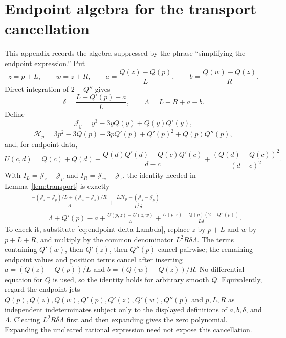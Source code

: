 \section{Endpoint algebra for the transport cancellation}\label{app:endpoints}

This appendix records the algebra suppressed by the phrase ``simplifying the
endpoint expression.'' Put
\[
 z=p+L,\qquad w=z+R,\qquad
 a=\frac{Q(z)-Q(p)}L,\qquad b=\frac{Q(w)-Q(z)}R.
\]
Direct integration of \(2-Q''\) gives
\begin{equation}\label{eq:endpoint-delta-Lambda}
 \delta=\frac{L+Q'(p)-a}{L},\qquad
 \Lambda=L+R+a-b.
\end{equation}
Define
\[
 \mathcal J_y=y^3-3yQ(y)+Q(y)Q'(y),
\]
\[
 \mathcal H_p=3p^2-3Q(p)-3pQ'(p)+Q'(p)^2+Q(p)Q''(p),
\]
and, for endpoint data,
\[
 U(c,d)=Q(c)+Q(d)-\frac{Q(d)Q'(d)-Q(c)Q'(c)}{d-c}
 +\frac{(Q(d)-Q(c))^2}{(d-c)^2}.
\]
With \(I_L=\mathcal J_z-\mathcal J_p\) and
\(I_R=\mathcal J_w-\mathcal J_z\), the identity needed in
Lemma~\ref{lem:transport} is exactly
\begin{align*}
&\frac{-(\mathcal J_z-\mathcal J_p)/L
 +(\mathcal J_w-\mathcal J_z)/R}{\Lambda}
 +\frac{L\mathcal H_p-(\mathcal J_z-\mathcal J_p)}{L^2\delta}\\
&\quad=\Lambda+Q'(p)-a
 +\frac{U(p,z)-U(z,w)}{\Lambda}
 +\frac{U(p,z)-Q(p)(2-Q''(p))}{L\delta}.
\end{align*}
To check it, substitute \eqref{eq:endpoint-delta-Lambda}, replace
\(z\) by \(p+L\) and \(w\) by \(p+L+R\), and multiply by the common
denominator \(L^2R\delta\Lambda\). The terms containing \(Q'(w)\), then
\(Q'(z)\), then \(Q''(p)\) cancel pairwise; the remaining endpoint values and
position terms cancel after inserting \(a=(Q(z)-Q(p))/L\) and
\(b=(Q(w)-Q(z))/R\). No differential equation for \(Q\) is used, so the
identity holds for arbitrary smooth \(Q\).
Equivalently, regard the endpoint jets
\(Q(p),Q(z),Q(w),Q'(p),Q'(z),Q'(w),Q''(p)\) and \(p,L,R\) as independent
indeterminates subject only to the displayed definitions of \(a,b,\delta\),
and \(\Lambda\). Clearing \(L^2R\delta\Lambda\) first and then expanding gives
the zero polynomial. Expanding the uncleared rational expression need not
expose this cancellation.
